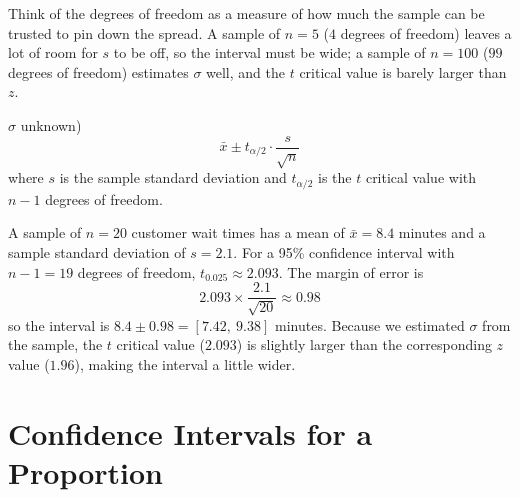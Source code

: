 \documentclass[
  11pt,
  letterpaper,
  DIV=11,
  numbers=noendperiod,
  oneside,
  open=any]{scrreprt}
\begin{document}
\begin{tcolorbox}[enhanced jigsaw, breakable, left=2mm, title=\textcolor{quarto-callout-note-color}{\faInfo}\hspace{0.5em}{Note}, coltitle=black, colframe=quarto-callout-note-color-frame, rightrule=.15mm, toprule=.15mm, arc=.35mm, opacityback=0, titlerule=0mm, bottomtitle=1mm, toptitle=1mm, colback=white, colbacktitle=quarto-callout-note-color!10!white, opacitybacktitle=0.6, leftrule=.75mm, bottomrule=.15mm]

Think of the degrees of freedom as a measure of how much the sample can
be trusted to pin down the spread. A sample of \(n = 5\) (\(4\) degrees
of freedom) leaves a lot of room for \(s\) to be off, so the interval
must be wide; a sample of \(n = 100\) (\(99\) degrees of freedom)
estimates \(\sigma\) well, and the \(t\) critical value is barely larger
than \(z\).

\end{tcolorbox}

\begin{bsformula}

\(\sigma\) unknown)
\[\bar{x} \pm t_{\alpha/2} \cdot \frac{s}{\sqrt{n}}\] where \(s\) is the
sample standard deviation and \(t_{\alpha/2}\) is the \(t\) critical
value with \(n - 1\) degrees of freedom.

\end{bsformula}

\begin{bsexample}[Example]

A sample of \(n = 20\) customer wait times has a mean of
\(\bar{x} = 8.4\) minutes and a sample standard deviation of
\(s = 2.1\). For a 95\% confidence interval with \(n - 1 = 19\) degrees
of freedom, \(t_{0.025} \approx 2.093\). The margin of error is
\[2.093 \times \frac{2.1}{\sqrt{20}} \approx 0.98\] so the interval is
\(8.4 \pm 0.98 = [7.42,\ 9.38]\) minutes. Because we estimated
\(\sigma\) from the sample, the \(t\) critical value (\(2.093\)) is
slightly larger than the corresponding \(z\) value (\(1.96\)), making
the interval a little wider.

\end{bsexample}

\section{Confidence Intervals for a
Proportion}\label{confidence-intervals-for-a-proportion}
\end{document}
